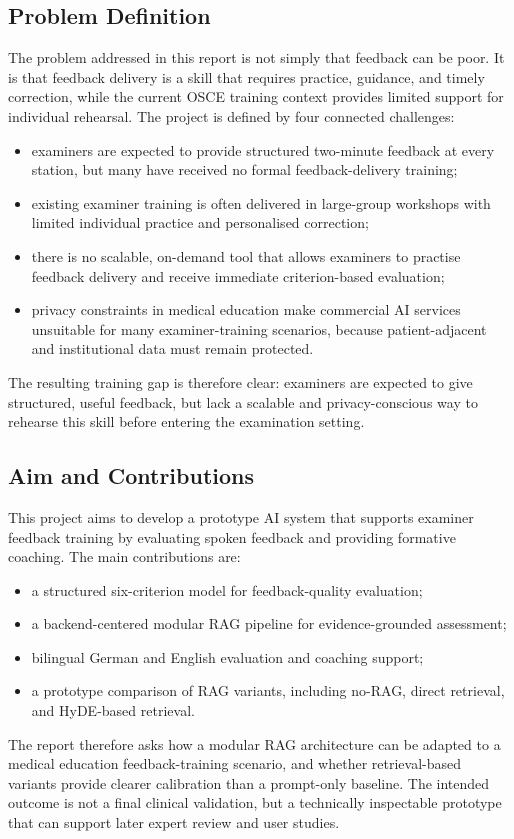 \subsection{Problem Definition}
The problem addressed in this report is not simply that feedback can be poor. It
is that feedback delivery is a skill that requires practice, guidance, and
timely correction, while the current OSCE training context provides limited
support for individual rehearsal. The project is defined by four connected
challenges:
\begin{itemize}
    \item examiners are expected to provide structured two-minute feedback at
    every station, but many have received no formal feedback-delivery training;
    \item existing examiner training is often delivered in large-group
    workshops with limited individual practice and personalised correction;
    \item there is no scalable, on-demand tool that allows examiners to practise
    feedback delivery and receive immediate criterion-based evaluation;
    \item privacy constraints in medical education make commercial AI services
    unsuitable for many examiner-training scenarios, because patient-adjacent
    and institutional data must remain protected.
\end{itemize}

The resulting training gap is therefore clear: examiners are expected to give
structured, useful feedback, but lack a scalable and privacy-conscious way to
rehearse this skill before entering the examination setting.

\subsection{Aim and Contributions}
This project aims to develop a prototype AI system that supports examiner
feedback training by evaluating spoken feedback and providing formative
coaching. The main contributions are:
\begin{itemize}
    \item a structured six-criterion model for feedback-quality evaluation;
    \item a backend-centered modular RAG pipeline for evidence-grounded
    assessment;
    \item bilingual German and English evaluation and coaching support;
    \item a prototype comparison of RAG variants, including no-RAG, direct
    retrieval, and HyDE-based retrieval.
\end{itemize}

The report therefore asks how a modular RAG architecture can be adapted to a
medical education feedback-training scenario, and whether retrieval-based
variants provide clearer calibration than a prompt-only baseline. The intended
outcome is not a final clinical validation, but a technically inspectable
prototype that can support later expert review and user studies.
